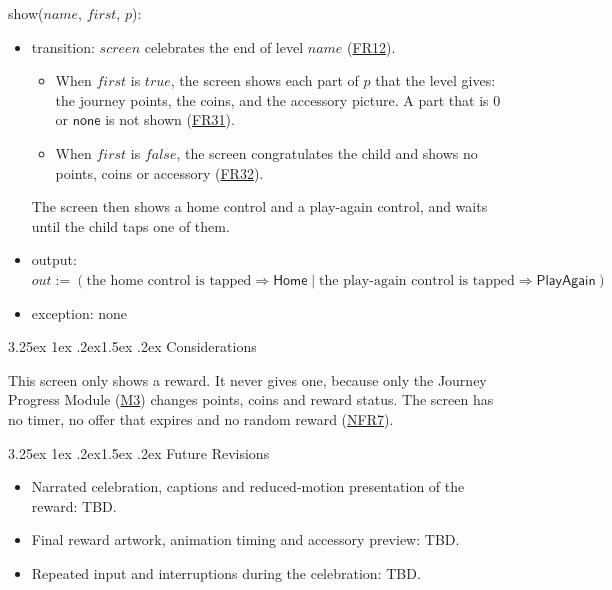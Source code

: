 \documentclass[10pt, titlepage]{article}
\makeatletter
\newcommand{\srsurl}{https://team-hindsight.github.io/ophthamology-game/SRS/SRS.pdf}
\newcommand{\srsitemref}[2]{\href{\srsurl\#nameddest=#1}{#2}}
\newcommand{\misref}[2]{\hyperref[mis:#1]{M#2}}
\renewcommand\paragraph{\@startsection{paragraph}{4}{\z@}%
  {3.25ex \@plus 1ex \@minus .2ex}{1.5ex \@plus .2ex}%
  {\normalfont\normalsize\bfseries}}
\newcommand{\T}[1]{\mathit{#1}}          %
\newcommand{\V}[1]{\mathsf{#1}}          %
\newcommand{\out}{\mathit{out}}
\newcommand{\true}{\mathit{true}}
\newcommand{\false}{\mathit{false}}
\makeatother
\begin{document}
\begin{samepage}
\noindent show($\T{name}$, $\T{first}$, $p$):
\begin{itemize}
\item transition: $\T{screen}$ celebrates the end of level $\T{name}$
  (\srsitemref{FR_LevelEnd}{FR12}).
  \begin{itemize}
  \item When $\T{first}$ is $\true$, the screen shows each part of $p$ that the
    level gives: the journey points, the coins, and the accessory picture. A
    part that is 0 or $\V{none}$ is not shown
    (\srsitemref{FR_FirstReward}{FR31}).
  \item When $\T{first}$ is $\false$, the screen congratulates the child and
    shows no points, coins or accessory
    (\srsitemref{FR_NoDuplicateReward}{FR32}).
  \end{itemize}
  The screen then shows a home control and a play-again control, and waits
  until the child taps one of them.
\item output: $\out := (\text{the home control is tapped} \Rightarrow
  \V{Home} \mid \text{the play-again control is tapped} \Rightarrow
  \V{PlayAgain})$
\item exception: none
\end{itemize}
\end{samepage}
\par\pagebreak[0]

\paragraph{Considerations}

This screen only shows a reward. It never gives one, because only the Journey
Progress Module (\misref{Progress}{3}) changes points, coins and reward status. The screen has no
timer, no offer that expires and no random reward
(\srsitemref{NFR_NoPressure}{NFR7}).

\paragraph{Future Revisions}

\begin{itemize}
\item Narrated celebration, captions and reduced-motion presentation of the reward: TBD.
\item Final reward artwork, animation timing and accessory preview: TBD.
\item Repeated input and interruptions during the celebration: TBD.
\end{itemize}
\end{document}
